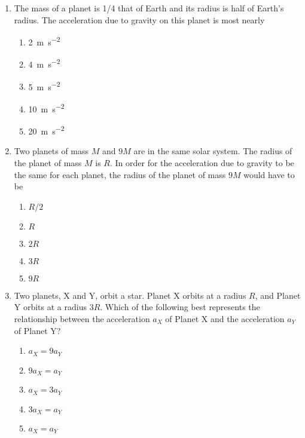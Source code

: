 \documentclass{../../../oss-classkick}
\begin{document}
\begin{multicols}{2}
\begin{enumerate}[leftmargin=18pt,resume]
  \item The mass of a planet is 1/4 that of Earth and its radius is half of
    Earth's radius. The acceleration due to gravity on this planet is most
    nearly
    \begin{enumerate}[nosep,leftmargin=18pt,label=(\Alph*)]
    \item\SI{2}{\metre\per\second\squared}
    \item\SI{4}{\metre\per\second\squared}
    \item\SI{5}{\metre\per\second\squared}
    \item\SI{10}{\metre\per\second\squared}
    \item\SI{20}{\metre\per\second\squared}
    \end{enumerate}
  
  \item Two planets of mass $M$ and $9M$ are in the same solar system. The
    radius of the planet of mass $M$ is $R$. In order for the acceleration due
    to gravity to be the same for each planet, the radius of the planet of mass
    $9M$ would have to be
    \begin{enumerate}[nosep,leftmargin=18pt,label=(\Alph*)]
    \item $R/2$
    \item $R$
    \item $2R$
    \item $3R$
    \item $9R$
    \end{enumerate}
    
  \item Two planets, X and Y, orbit a star. Planet X orbits at a radius $R$, and
    Planet Y orbits at a radius $3R$. Which of the following best represents
    the relationship between the acceleration $a_X$ of Planet X and the
    acceleration $a_Y$ of Planet Y?
    \begin{center}
    \end{center}
    \begin{enumerate}[nosep,leftmargin=18pt,label=(\Alph*)]
    \item $a_X = 9a_Y$
    \item $9a_X = a_Y$
    \item $a_X = 3a_Y$
    \item $3a_X = a_Y$
    \item $a_X = a_Y$
    \end{enumerate}
    

\end{enumerate}
\end{multicols}
\end{document}
